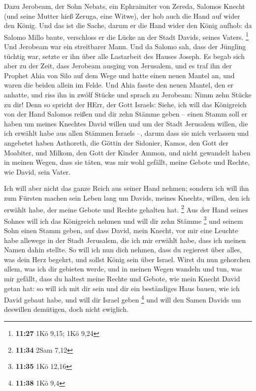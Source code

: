  Dazu Jerobeam, der Sohn Nebats, ein Ephraimiter von
Zereda, Salomos Knecht (und seine Mutter hieß Zeruga, eine Witwe), der
hob auch die Hand auf wider den König.  Und das ist die
Sache, darum er die Hand wider den König aufhob: da Salomo Millo baute,
verschloss er die Lücke an der Stadt Davids, seines Vaters. \footnote{\textbf{11:27}
  1Kö 9,15; 1Kö 9,24}  Und Jerobeam war ein streitbarer
Mann. Und da Salomo sah, dass der Jüngling tüchtig war, setzte er ihn
über alle Lastarbeit des Hauses Joseph.  Es begab sich aber
zu der Zeit, dass Jerobeam ausging von Jerusalem, und es traf ihn der
Prophet Ahia von Silo auf dem Wege und hatte einen neuen Mantel an, und
waren die beiden allein im Felde.  Und Ahia fasste den
neuen Mantel, den er anhatte, und riss ihn in zwölf Stücke 
und sprach zu Jerobeam: Nimm zehn Stücke zu dir! Denn so spricht der
HErr, der Gott Israels: Siehe, ich will das Königreich von der Hand
Salomos reißen und dir zehn Stämme geben --  einen Stamm
soll er haben um meines Knechtes David willen und um der Stadt Jerusalem
willen, die ich erwählt habe aus allen Stämmen Israels --, 
darum dass sie mich verlassen und angebetet haben Asthoreth, die Göttin
der Sidonier, Kamos, den Gott der Moabiter, und Milkom, den Gott der
Kinder Ammon, und nicht gewandelt haben in meinen Wegen, dass sie täten,
was mir wohl gefällt, meine Gebote und Rechte, wie David, sein Vater.

 Ich will aber nicht das ganze Reich aus seiner Hand
nehmen; sondern ich will ihn zum Fürsten machen sein Leben lang um
Davids, meines Knechts, willen, den ich erwählt habe, der meine Gebote
und Rechte gehalten hat. \footnote{\textbf{11:34} 2Sam 7,12}
 Aus der Hand seines Sohnes will ich das Königreich nehmen
und will dir zehn Stämme \footnote{\textbf{11:35} 1Kö 12,16}
 und seinem Sohn einen Stamm geben, auf dass David, mein
Knecht, vor mir eine Leuchte habe allewege in der Stadt Jerusalem, die
ich mir erwählt habe, dass ich meinen Namen dahin stellte. 
So will ich nun dich nehmen, dass du regierest über alles, was dein Herz
begehrt, und sollst König sein über Israel.  Wirst du nun
gehorchen allem, was ich dir gebieten werde, und in meinen Wegen wandeln
und tun, was mir gefällt, dass du haltest meine Rechte und Gebote, wie
mein Knecht David getan hat: so will ich mit dir sein und dir ein
beständiges Haus bauen, wie ich David gebaut habe, und will dir Israel
geben \footnote{\textbf{11:38} 1Kö 9,4}  und will den Samen
Davids um deswillen demütigen, doch nicht ewiglich.

